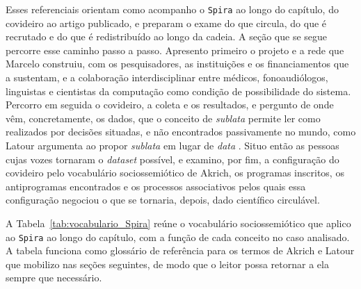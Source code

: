 Esses referenciais orientam como acompanho o \texttt{Spira} ao longo do capítulo, do covideiro ao artigo publicado, e preparam o exame do que circula, do que é recrutado e do que é redistribuído ao longo da cadeia. A seção que se segue percorre esse caminho passo a passo. Apresento primeiro o projeto e a rede que Marcelo construiu, com os pesquisadores, as instituições e os financiamentos que a sustentam, e a colaboração interdisciplinar entre médicos, fonoaudiólogos, linguistas e cientistas da computação como condição de possibilidade do sistema. Percorro em seguida o covideiro, a coleta e os resultados, e pergunto de onde vêm, concretamente, os dados, que o conceito de \textit{sublata} permite ler como realizados por decisões situadas, e não encontrados passivamente no mundo, como Latour argumenta ao propor \textit{sublata} em lugar de \textit{data} \parencite[p.~42]{Latour2017Esperanca}. Situo então as pessoas cujas vozes tornaram o \textit{dataset} possível, e examino, por fim, a configuração do covideiro pelo vocabulário sociossemiótico de Akrich, os programas inscritos, os antiprogramas encontrados e os processos associativos pelos quais essa configuração negociou o que se tornaria, depois, dado científico circulável.

A Tabela~\ref{tab:vocabulario_Spira} reúne o vocabulário sociossemiótico que aplico ao \texttt{Spira} ao longo do capítulo, com a função de cada conceito no caso analisado. A tabela funciona como glossário de referência para os termos de Akrich e Latour que mobilizo nas seções seguintes, de modo que o leitor possa retornar a ela sempre que necessário.

